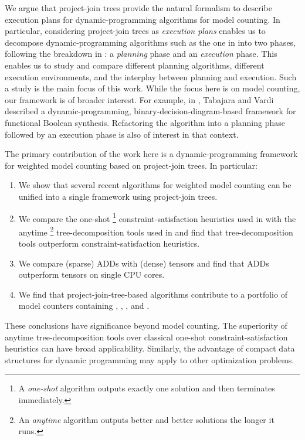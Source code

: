We argue that project-join trees provide the natural formalism to describe execution plans for dynamic-programming algorithms for model counting.
In particular, considering project-join trees as \emph{execution plans} enables us to decompose dynamic-programming algorithms such as the one in \cite{dudek2020addmc} into two phases, following the breakdown in \cite{dudek2020parallel}: a \emph{planning} phase and an \emph{execution} phase.
This enables us to study and compare different planning algorithms, different execution environments, and the interplay between planning and execution.
Such a study is the main focus of this work.
While the focus here is on model counting, our framework is of broader interest.
For example, in \cite{tabajara2017factored}, Tabajara and Vardi described a dynamic-programming, binary-decision-diagram-based framework for functional Boolean synthesis.
Refactoring the algorithm into a planning phase followed by an execution phase is also of interest in that context.

The primary contribution of the work here is a dynamic-programming framework for weighted model counting based on project-join trees.
In particular:
\begin{enumerate}
    \item We show that several recent algorithms for weighted model counting \cite{dudek2020addmc,dudek2019efficient,fichte2020exploiting} can be unified into a single framework using project-join trees.
    \item We compare the one-shot%
    \footnote{A \emph{one-shot} algorithm outputs exactly one solution and then terminates immediately.}
    constraint-satisfaction heuristics used in \cite{dudek2020addmc} with the anytime%
    \footnote{An \emph{anytime} algorithm outputs better and better solutions the longer it runs.} tree-decomposition tools used in \cite{dudek2019efficient} and find that
    tree-decomposition tools outperform
    constraint-satisfaction heuristics.
    \item We compare (sparse) ADDs \cite{bahar1997algebraic} with (dense) tensors \cite{kjolstad2017tensor} and find that ADDs outperform tensors on single CPU cores.
    \item We find that project-join-tree-based algorithms contribute to a portfolio of model counters containing \cachet{} \cite{sang2004combining}, \ctd{} \cite{darwiche2004new}, \df{} \cite{lagniez2017improved}, and \minictd{} \cite{oztok2015top}.
\end{enumerate}
These conclusions have significance beyond model counting.
The superiority of anytime tree-decomposition tools over classical one-shot constraint-satisfaction heuristics can have broad applicability.
Similarly, the advantage of compact data structures for dynamic programming may apply to other optimization problems.


